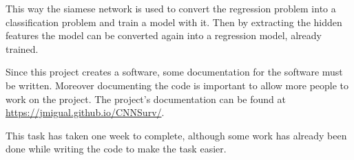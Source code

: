 This way the siamese network is used to convert the regression problem into a classification 
problem and train a model with it. Then by extracting the hidden features the model can be
converted again into a regression model, already trained.


Since this project creates a software, some documentation for the software must be written.
Moreover documenting the code is important to allow more people to work on the project.
The project's documentation can be found at \url{https://jmigual.github.io/CNNSurv/}.

This task has taken one week to complete, although some work has already been done while 
writing the code to make the task easier.

